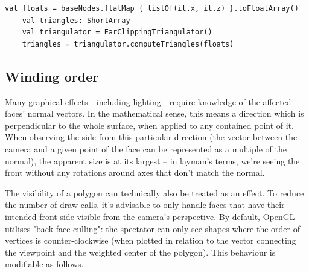 \begin{lstlisting}[caption=Example usage of the EarClippingTriangulator class]
    val floats = baseNodes.flatMap { listOf(it.x, it.z) }.toFloatArray()
    val triangles: ShortArray
    val triangulator = EarClippingTriangulator()
    triangles = triangulator.computeTriangles(floats)
\end{lstlisting}

\subsection{Winding order}

Many graphical effects - including lighting - require knowledge of the affected faces' normal vectors. In the mathematical sense, this means a direction which is perpendicular to the whole surface, when applied to any contained point of it. %
When observing the side from this particular direction (the vector between the camera and a given point of the face can be represented as a multiple of the normal), the apparent size is at its largest -- in layman's terms, we're seeing the front without any rotations around axes that don't match the normal.%

The visibility of a polygon can technically also be treated as an effect. To reduce the number of draw calls, it's advisable to only handle faces that have their intended front side visible from the camera's perspective. By default, OpenGL utilises "back-face culling": the spectator can only see shapes where the order of vertices is counter-clockwise (when plotted in relation to the vector connecting the viewpoint and the weighted center of the polygon). This behaviour is modifiable as follows.

